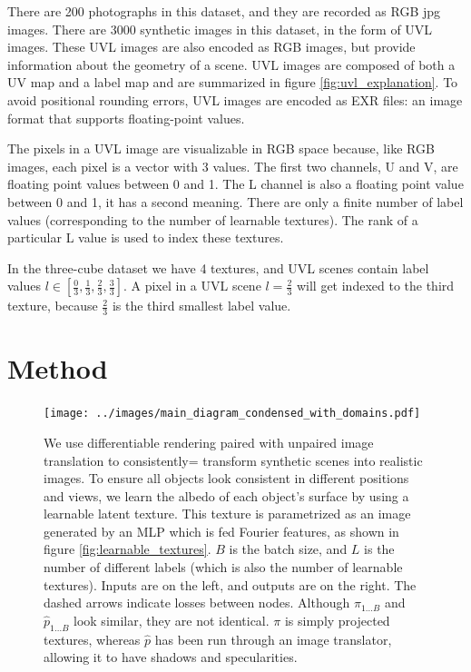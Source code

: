 \documentclass{article}
\begin{document}
There are 200 photographs in this dataset, and they are recorded as RGB jpg images.
There are 3000 synthetic images in this dataset, in the form of UVL images.
These UVL images are also encoded as RGB images, but provide information about the geometry of a scene.
UVL images are composed of both a UV map and a label map and are summarized in figure \ref{fig:uvl_explanation}.
To avoid positional rounding errors, UVL images are encoded as EXR files: an image format that supports floating-point values.

The pixels in a UVL image are visualizable in RGB space because, like RGB images, each pixel is a vector with 3 values. The first two channels, U and V, are floating point values between 0 and 1. The L channel is also a floating point value between 0 and 1, it has a second meaning. There are only a finite number of label values (corresponding to the number of learnable textures). The rank of a particular L value is used to index these textures.

In the three-cube dataset we have 4 textures, and UVL scenes contain label values $l \in [\frac{0}{3}, \frac{1}{3},\frac{2}{3}, \frac{3}{3}]$. A pixel in a UVL scene $l=\frac{2}{3}$ will get indexed to the third texture, because $\frac{2}{3}$ is the third smallest label value.


\section{Method}
\label{sec:method}


	\begin{figure}[H]
		\begin{center}
			\texttt{[image: ../images/main\_diagram\_condensed\_with\_domains.pdf]}
		\end{center}
		\caption{
			We use differentiable rendering paired with unpaired image translation to consistently= transform synthetic scenes into realistic images.
			To ensure all objects look consistent in different positions and views, we learn the albedo of each object's surface by using a learnable latent texture.
			This texture is parametrized as an image generated by an MLP which is fed Fourier features, as shown in figure \ref{fig:learnable_textures}.
			$B$ is the batch size, and $L$ is the number of different labels (which is also the number of learnable textures).
			Inputs are on the left, and outputs are on the right.
			The dashed arrows indicate losses between nodes.
			Although $\pi_{1\dots B}$ and $\hat{p}_{1\dots B}$ look similar, they are not identical. 
			$\pi$ is simply projected textures, whereas $\hat{p}$ has been run through an image translator, allowing it to have shadows and specularities.
		}
		\label{fig:main_diagram}
	\end{figure}
\end{document}
